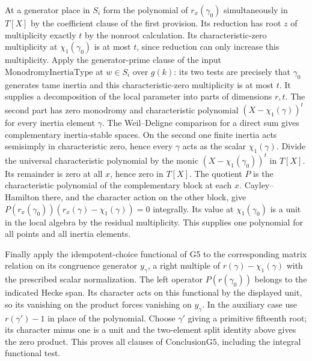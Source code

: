 At a generator place in $S_i$ form the polynomial of
$r_x(\gamma_0)$ simultaneously in $T[X]$ by the coefficient
clause of the first provision. Its reduction has root $z$ of
multiplicity exactly $t$ by the nonroot calculation. Its
characteristic-zero multiplicity at $\chi_1(\gamma_0)$ is at
most $t$, since reduction can only increase this multiplicity.
Apply the generator-prime clause of the input
$\mathrm{MonodromyInertiaType}$ at $w\in S_i$ over $g(k)$:
its two tests are precisely that $\gamma_0$ generates tame
inertia and this characteristic-zero multiplicity is at most
$t$. It supplies a decomposition of the local parameter into
parts of dimensions $r,t$. The second part has zero monodromy
and characteristic polynomial $(X-\chi_1(\gamma))^t$ for
every inertia element $\gamma$. The Weil--Deligne comparison
for a direct sum gives complementary inertia-stable spaces.
On the second one finite inertia acts semisimply in
characteristic zero, hence every $\gamma$ acts as the scalar
$\chi_1(\gamma)$. Divide the universal characteristic polynomial by the
monic $(X-\chi_1(\gamma_0))^t$ in $T[X]$. Its remainder is zero
at all $x$, hence zero in $T[X]$. The quotient $P$ is the
characteristic polynomial of the complementary block at each
$x$. Cayley--Hamilton there, and the character action on the
other block, give
$P(r_x(\gamma_0))(r_x(\gamma)-\chi_1(\gamma))=0$ integrally.
Its value at $\chi_1(\gamma_0)$ is a unit in the local algebra
by the residual multiplicity. This supplies one polynomial for
all points and all inertia elements.

Finally apply the idempotent-choice functional of G5 to the
corresponding matrix relation on its congruence generator
$y_\gamma$, a right multiple of $r(\gamma)-\chi_1(\gamma)$
with the prescribed scalar normalization. The left operator
$P(r(\gamma_0))$ belongs to the indicated Hecke span. Its
character acts on this functional by the displayed unit, so
its vanishing on the product forces vanishing on $y_\gamma$.
In the auxiliary case use $r(\gamma')-1$ in place of the
polynomial. Choose $\gamma'$ giving a primitive fifteenth root;
its character minus one is a unit and the two-element split
identity above gives the zero product. This proves all clauses
of $\mathrm{ConclusionG5}$, including the integral functional
test.

